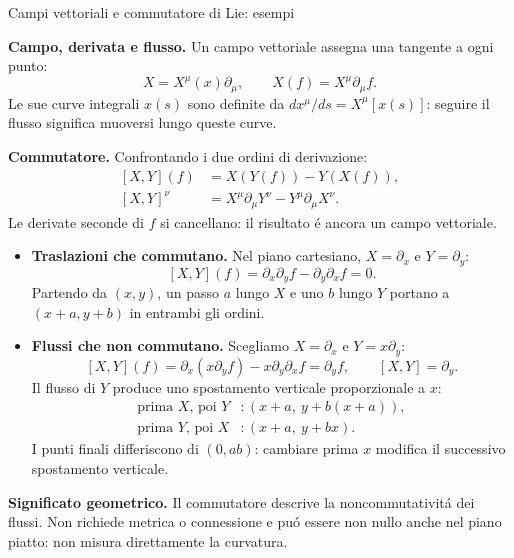 \begin{frame}[t]{Campi vettoriali e commutatore di Lie: esempi}
\small\raggedright

\textbf{Campo, derivata e flusso.}
Un campo vettoriale assegna una tangente a ogni punto:
\[
X=X^\mu(x)\partial_\mu,\qquad
X(f)=X^\mu\partial_\mu f.
\]
Le sue curve integrali $x(s)$ sono definite da $dx^\mu/ds=X^\mu[x(s)]$: seguire il flusso significa muoversi lungo queste curve.

\textbf{Commutatore.}
Confrontando i due ordini di derivazione:
\[
\begin{aligned}
[X,Y](f)&=X(Y(f))-Y(X(f)),\\
[X,Y]^\nu&=X^\mu\partial_\mu Y^\nu
           -Y^\mu\partial_\mu X^\nu.
\end{aligned}
\]
Le derivate seconde di $f$ si cancellano: il risultato \'e ancora un campo vettoriale.
\begin{itemize}
\item \textbf{Traslazioni che commutano.}
Nel piano cartesiano, $X=\partial_x$ e $Y=\partial_y$:
\[
[X,Y](f)=\partial_x\partial_y f-\partial_y\partial_x f=0.
\]
Partendo da $(x,y)$, un passo $a$ lungo $X$ e uno $b$ lungo $Y$
portano a $(x+a,y+b)$ in entrambi gli ordini.

\item \textbf{Flussi che non commutano.}
Scegliamo $X=\partial_x$ e $Y=x\partial_y$:
\[
[X,Y](f)=\partial_x(x\partial_y f)
-x\partial_y\partial_x f=\partial_y f,
\qquad \boxed{[X,Y]=\partial_y}.
\]
Il flusso di $Y$ produce uno spostamento verticale proporzionale a $x$:
\[
\begin{aligned}
\text{prima }X\text{, poi }Y &: (x+a,\ y+b(x+a)),\\
\text{prima }Y\text{, poi }X &: (x+a,\ y+bx).
\end{aligned}
\]
I punti finali differiscono di $(0,ab)$: cambiare prima $x$
modifica il successivo spostamento verticale.
\end{itemize}

\textbf{Significato geometrico.}
Il commutatore descrive la noncommutativit\'a dei flussi.
Non richiede metrica o connessione e pu\'o essere non nullo
anche nel piano piatto: non misura direttamente la curvatura.
\end{frame}

